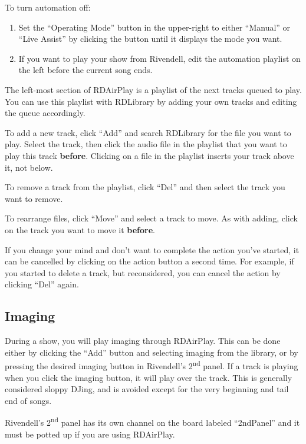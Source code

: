 \documentclass{witrman}
\begin{document}
To turn automation off:
\begin{enumerate}
    \item Set the ``Operating Mode'' button in the upper-right to either
        ``Manual'' or ``Live Assist'' by clicking the button until it displays
        the mode you want.
    \item If you want to play your show from Rivendell, edit the automation
        playlist on the left before the current song ends.
\end{enumerate}

The left-most section of RDAirPlay is a playlist of the next tracks queued to
play.  You can use this playlist with RDLibrary by adding your own tracks and
editing the queue accordingly.

To add a new track, click ``Add'' and search RDLibrary for the file you want to
play.  Select the track, then click the audio file in the playlist that you want
to play this track \textbf{before}.  Clicking on a file in the playlist inserts
your track above it, not below.

To remove a track from the playlist, click ``Del'' and then select the track you
want to remove.

To rearrange files, click ``Move'' and select a track to move.  As with adding,
click on the track you want to move it \textbf{before}.

If you change your mind and don't want to complete the action you've started, it
can be cancelled by clicking on the action button a second time.  For example,
if you started to delete a track, but reconsidered, you can cancel the action by
clicking ``Del'' again.

\subsection{Imaging}

During a show, you will play imaging through RDAirPlay.  This can be done either
by clicking the ``Add'' button and selecting imaging from the library, or by
pressing the desired imaging button in Rivendell's 2\textsuperscript{nd} panel.
If a track is playing when you click the imaging button, it will play over the
track.  This is generally considered sloppy DJing, and is avoided except for the
very beginning and tail end of songs.

Rivendell's 2\textsuperscript{nd} panel has its own channel on the board labeled
``2ndPanel'' and it must be potted up if you are using RDAirPlay.
\end{document}
